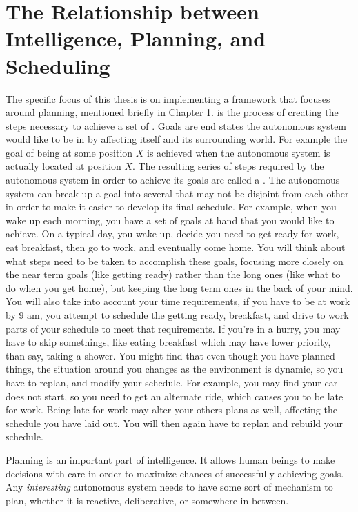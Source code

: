 \section{The Relationship between Intelligence, Planning, and Scheduling}
The specific focus of this thesis is on implementing a framework that focuses around planning, mentioned briefly in Chapter 1.  is the process of creating the steps necessary to achieve a set of . Goals are end states the autonomous system would like to be in by affecting itself and its surrounding world. For example the goal of being at some position $X$ is achieved when the autonomous system is actually located at position $X$. The resulting series of steps required by the autonomous system in order to achieve its goals are called a . The autonomous system can break up a goal into several  that may not be disjoint from each other in order to make it easier to develop its final schedule. For example, when you wake up each morning, you have a set of goals at hand that you would like to achieve. On a typical day, you wake up, decide you need to get ready for work, eat breakfast, then go to work, and eventually come home. You will think about what steps need to be taken to accomplish these goals, focusing more closely on the near term goals (like getting ready) rather than the long ones (like what to do when you get home), but keeping the long term ones in the back of your mind. You will also take into account your time requirements, if you have to be at work by 9 am, you attempt to schedule the getting ready, breakfast, and drive to work parts of your schedule to meet that requirements. If you're in a hurry, you may have to skip somethings, like eating breakfast which may have lower priority, than say, taking a shower. You  might find that even though you have planned things, the situation around you changes as the environment is dynamic, so you have to replan, and modify your schedule. For example, you may find your car does not start, so you need to get an alternate ride, which causes you to be late for work. Being late for work may alter your others plans as well, affecting the schedule you have laid out. You will then again have to replan and rebuild your schedule.

Planning is an important part of intelligence. It allows human beings to make decisions with care in order to maximize chances of successfully achieving goals. Any \textit{interesting} autonomous system needs to have some sort of mechanism to plan, whether it is reactive, deliberative, or somewhere in between.

